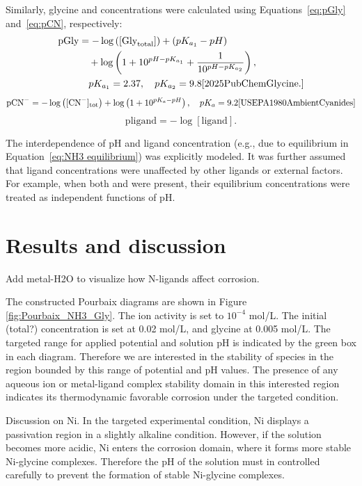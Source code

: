 \documentclass[journal=jacsat,manuscript=article]{achemso}
\begin{document}
Similarly, glycine and  concentrations were calculated using Equations~\eqref{eq:pGly} and~\eqref{eq:pCN}, respectively:
\begin{align} \label{eq:pGly}
\text{pGly} &= -\log \left([\text{Gly}_{\text{total}}]\right) + (pK_{a_1} - pH) \nonumber \\
&\quad + \log \left(1 + 10^{pH - pK_{a_1}} + \frac{1}{10^{pH - pK_{a_2}}} \right), \nonumber \\
&\quad pK_{a_1} = 2.37, \quad pK_{a_2} = 9.8 \cite{2025PubChemGlycine.}
\end{align}
\begin{equation} \label{eq:pCN}
\text{pCN}^- = -\log \left([\text{CN}^-]_{\text{tot}}\right) + \log \left(1 + 10^{pK_a - pH} \right), \quad pK_a = 9.2 \cite{USEPA1980AmbientCyanides}
\end{equation}
\begin{equation} \label{eq:pligand}
\text{pligand} = -\log[\text{ligand}].
\end{equation}

The interdependence of pH and ligand concentration (e.g., due to  equilibrium in Equation~\eqref{eq:NH3 equilibrium}) was explicitly modeled. It was further assumed that ligand concentrations were unaffected by other ligands or external factors. For example, when both  and  were present, their equilibrium concentrations were treated as independent functions of pH.



\section{Results and discussion}
Add metal-H2O to visualize how N-ligands affect corrosion.

The constructed Pourbaix diagrams are shown in Figure \ref{fig:Pourbaix_NH3_Gly}. The ion activity is set to $10^{-4}$ mol/L. The initial (total?)  concentration is set at 0.02 mol/L, and glycine at 0.005 mol/L. The targeted range for applied potential and solution pH is indicated by the green box in each diagram. Therefore we are interested in the stability of species in the region bounded by this range of potential and pH values. The presence of any aqueous ion or metal-ligand complex stability domain in this interested region indicates its thermodynamic favorable corrosion under the targeted condition. 

\cite{}
Discussion on Ni. In the targeted experimental condition, Ni displays a passivation region in a slightly alkaline condition. However, if the solution becomes more acidic, Ni enters the corrosion domain, where it forms more stable Ni-glycine complexes. Therefore the pH of the solution must in controlled carefully to prevent the formation of stable Ni-glycine complexes. 
\end{document}
